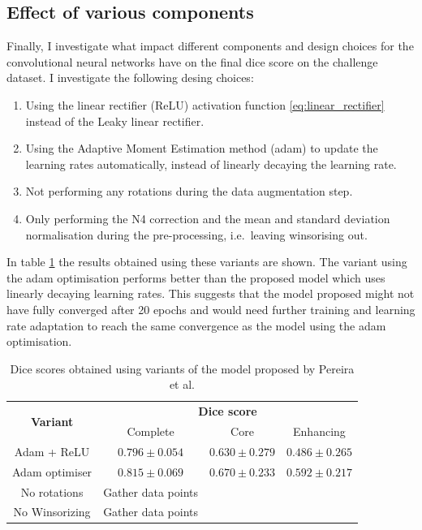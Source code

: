 \documentclass[12pt,a4paper,twoside,openright]{report}
\begin{document}
\subsection{Effect of various components}
Finally, I investigate what impact different components and design choices for the convolutional neural networks have on the final dice score on the challenge dataset. I investigate the following desing choices:
\begin{enumerate}
	\item Using the linear rectifier (ReLU) activation function \ref{eq:linear_rectifier} instead of the Leaky linear rectifier.
	\item Using the Adaptive Moment Estimation method (adam) \cite{adam} to update the learning rates automatically, instead of linearly decaying the learning rate.
	\item Not performing any rotations during the data augmentation step.
	\item Only performing the N4 correction \cite{n4itk} and the mean and standard deviation normalisation during the pre-processing, i.e.\ leaving winsorising out.
\end{enumerate}
In table \ref{table:variants_dice_results} the results obtained using these variants are shown. The variant using the adam optimisation performs better than the proposed model which uses linearly decaying learning rates. This suggests that the model proposed might not have fully converged after 20 epochs and would need further training and learning rate adaptation to reach the same convergence as the model using the adam optimisation.

\begin{table}
\centering	
\begin{tabular}{ c | c c c} 
\multirow{2}{*}{\textbf{Variant}} & \multicolumn{3}{c}{\textbf{Dice score}} \\
 & Complete & Core & Enhancing \\
 \hline
Adam + ReLU & $0.796 \pm 0.054$ & $0.630 \pm 0.279$ & $0.486 \pm 0.265$ \\
Adam optimiser & $0.815 \pm 0.069$ & $0.670 \pm 0.233$ & $0.592 \pm 0.217$ \\
No rotations & Gather data points \\
No Winsorizing & Gather data points \\
\end{tabular}
\caption{Dice scores obtained using variants of the model proposed by Pereira et al.}
\label{table:variants_dice_results}
\end{table}
\end{document}
